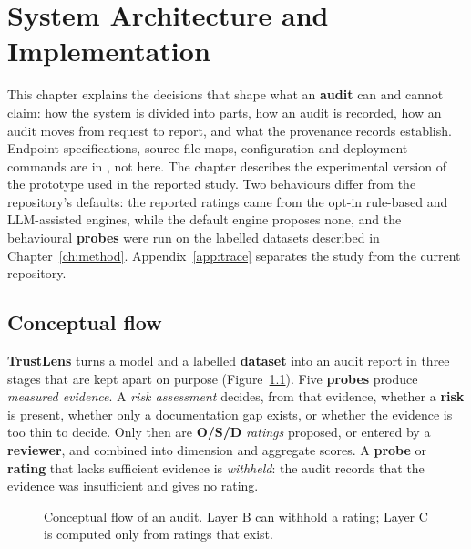 \chapter{System Architecture and Implementation}\label{ch:arch}

This chapter explains the decisions that shape what an \textbf{audit} can and cannot claim: how the system is divided into parts, how an audit is recorded, how an audit moves from request to report, and what the provenance records establish. Endpoint specifications, source-file maps, configuration and deployment commands are in , not here. The chapter describes the experimental version of the prototype used in the reported study. Two behaviours differ from the repository's defaults: the reported ratings came from the opt-in rule-based and LLM-assisted engines, while the default engine proposes none, and the behavioural \textbf{probes} were run on the labelled datasets described in Chapter~\ref{ch:method}. Appendix~\ref{app:trace} separates the study from the current repository.

\section{Conceptual flow}
\textbf{TrustLens} turns a model and a labelled \textbf{dataset} into an audit report in three stages that are kept apart on purpose (Figure~\ref{fig:pipeline}). Five \textbf{probes} produce \emph{measured evidence}. A \emph{risk assessment} decides, from that evidence, whether a \textbf{risk} is present, whether only a documentation gap exists, or whether the evidence is too thin to decide. Only then are \textbf{O/S/D} \emph{ratings} proposed, or entered by a \textbf{reviewer}, and combined into dimension and aggregate scores. A \textbf{probe} or \textbf{rating} that lacks sufficient evidence is \emph{withheld}: the audit records that the evidence was insufficient and gives no rating.

\begin{figure}[!htbp]
\centering
{}
\caption{Conceptual flow of an audit. Layer B can withhold a rating; Layer C is computed only from ratings that exist.}\label{fig:pipeline}
\end{figure}

